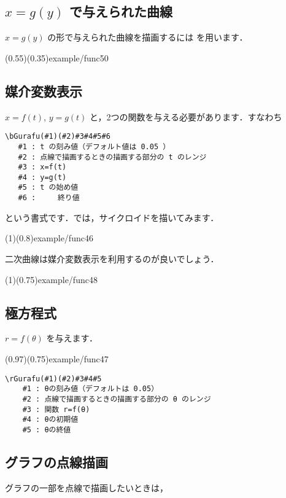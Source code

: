 \subsection{\texorpdfstring{$x=g(y)$}{x=g(y)} で与えられた曲線}
$x=g(y)$ の形で与えられた曲線を描画するには  を用います．

\showexample[$x=\sin y$ のグラフ](0.55)(0.35){example/func50}


\subsection{媒介変数表示}
$x=f(t)$, $y=g(t)$ と，2つの関数を与える必要があります．すなわち

\begin{jquote}
\begin{verbatim}
\bGurafu(#1)(#2)#3#4#5#6
   #1 : t の刻み値（デフォルト値は 0.05 ）
   #2 : 点線で描画するときの描画する部分の t のレンジ
   #3 : x=f(t)
   #4 : y=g(t)
   #5 : t の始め値
   #6 :     終り値
\end{verbatim}
\end{jquote}
という書式です．では，サイクロイドを描いてみます．

\showexample[サイクロイド](1)(0.8){example/func46}

二次曲線は媒介変数表示を利用するのが良いでしょう．

\showexample[双曲線](1)(0.75){example/func48}

\subsection{極方程式}
$r=f(\theta)$ を与えます．

\showexample[レムニスケート](0.97)(0.75){example/func47}

\begin{boxnote}
\begin{verbatim}
\rGurafu(#1)(#2)#3#4#5
    #1 : θの刻み値（デフォルトは 0.05）
    #2 : 点線で描画するときの描画する部分の θ のレンジ
    #3 : 関数 r=f(θ)
    #4 : θの初期値
    #5 : θの終値
\end{verbatim}
\end{boxnote}

\subsection{グラフの点線描画}
グラフの一部を点線で描画したいときは，

